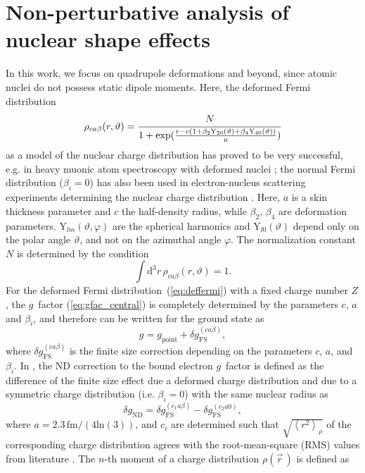 \section{Non-perturbative analysis of nuclear shape effects}
In this work, we focus on quadrupole deformations and beyond, since atomic nuclei do not possess static dipole moments. Here, the deformed Fermi distribution
\begin{equation}
\rho_{ca\beta}(r,\vartheta)=\cfrac{N}{1+\text{exp}(\frac{r-c(1+\beta_2 \text{Y}_{20}(\vartheta)+\beta_4 \text{Y}_{40}(\vartheta))}{a})}
\label{eq:deffermi}
\end{equation}
as a model of the nuclear charge distribution has proved to be very successful, e.g. in heavy muonic atom spectroscopy with deformed nuclei \cite{hitlin1970,tanaka1984}; the normal Fermi distribution (${\beta_i}{=}{0}$) has also been used in electron-nucleus scattering experiments determining the nuclear charge distribution \cite{hahn1956}. Here, $a$ is a skin thickness parameter and $c$ the half-density radius, while $\beta_2$, $\beta_4$ are deformation parameters. $\text{Y}_{lm}(\vartheta,\varphi)$ are the spherical harmonics and $\text{Y}_{l0}(\vartheta)$ depend only on the polar angle $\vartheta$, and not on the azimuthal angle $\varphi$. The normalization constant $N$ is determined by the condition
\begin{equation}
\int \text{d}^3r\, \rho_{ca\beta}(r,\vartheta)=1.
\end{equation}%
For the deformed Fermi distribution~(\ref{eq:deffermi}) with a fixed charge number $Z$, the $g$~factor (\ref{eq:gfac_central}) is completely determined by the parameters $c$, $a$ and $\beta_i$, and therefore can be written for the ground state as
\begin{equation}
g = g_{\text{point}} + \delta g^{(ca\beta)}_{\text{FS}},
\label{eq:finiteDef}
\end{equation}
where $\delta g^{(ca\beta)}_{\text{FS}}$ is the finite size correction depending on the parameters $c$, $a$, and $\beta_i$. In \cite{jacek2012}, the ND correction to the bound electron $g$~factor is defined as the difference of the finite size effect due a deformed charge distribution and due to a symmetric charge distribution (i.e. ${\beta_i}{=}{0}$) with the same nuclear radius as
\begin{equation}
\delta g_{\text{ND}}=\delta g^{(c_1a\beta)}_{\text{FS}} - \delta g^{(c_2a0)}_{\text{FS}},
\label{eq:defdgnd}
\end{equation}
where $a=2.3\,\text{fm}/(4\text{ln}(3))$, and $c_i$ are determined such that $\sqrt{\left<r^2\right>_{\rho}}$ of the corresponding charge distribution agrees with the root-mean-square (RMS) values from literature \cite{Angeli2013}. The $n$-th moment of a charge distribution $\rho(\vec{r}\,)$ is defined as

